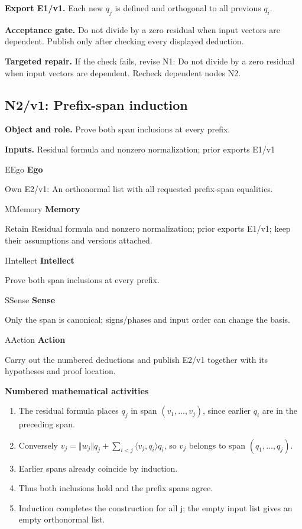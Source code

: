 \documentclass[preprint,12pt,aps,pra,showkeys,amsmath,amssymb,superscriptaddress,floatfix]{revtex4-2}
\theoremstyle{definition}
\theoremstyle{remark}
\newcommand{\mmfaculty}[3]{%
 \begin{mmfacultybox}{#1}{#2}
 {\sffamily\bfseries\color{MMBlue}#2}\par\smallskip #3
 \end{mmfacultybox}}
\newcommand{\field}[2]{\par\smallskip\noindent\textbf{#1.} #2\par}
\begin{document}
\field{Export E1/v1}{Each new \(q_j\) is defined and orthogonal to all previous \(q_i\).}

\field{Acceptance gate}{Do not divide by a zero residual when input vectors are dependent.
Publish only after checking every displayed deduction.}

\field{Targeted repair}{If the check fails, revise N1: Do not divide by a zero residual when
input vectors are dependent. Recheck dependent nodes N2.}

\clearpage

\subsection{N2/v1: Prefix-span induction}

\field{Object and role}{Prove both span inclusions at every prefix.}

\field{Inputs}{Residual formula and nonzero normalization; prior exports E1/v1}

\mmfaculty{E}{Ego}{Own E2/v1: An orthonormal list with all requested prefix-span
equalities.}

\mmfaculty{M}{Memory}{Retain Residual formula and nonzero normalization; prior exports E1/v1;
keep their assumptions and versions attached.}

\mmfaculty{I}{Intellect}{Prove both span inclusions at every prefix.}

\mmfaculty{S}{Sense}{Only the span is canonical; signs/phases and input order can change the
basis.}

\mmfaculty{A}{Action}{Carry out the numbered deductions and publish E2/v1 together with its
hypotheses and proof location.}

\smallskip\noindent\textbf{Numbered mathematical activities}

\begin{enumerate}[label=N2.\arabic*,leftmargin=3.4em]

\item The residual formula places \(q_j\) in span \((v_{1},\ldots ,v_j)\),
since earlier \(q_i\) are in the preceding span.

\item Conversely
\(v_j=\Vert w_j\Vert q_j+\sum _{i<j}\langle v_j,q_i\rangle q_i\), so
\(v_j\) belongs to span \((q_{1},\ldots ,q_j)\).

\item Earlier spans already coincide by induction.

\item Thus both inclusions hold and the prefix spans agree.

\item Induction completes the construction for all j; the empty input list
gives an empty orthonormal list.

\end{enumerate}
\end{document}
